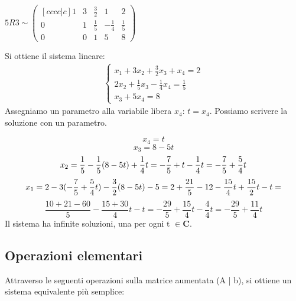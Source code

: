 \documentclass[12pt]{article}
\begin{document}
\begin{center}
$5R3 \sim
\begin{pmatrix}[cccc|c]
  1 & 3 & \frac{3}{2} & 1 & 2\\
  0 & 1 & \frac{1}{5} & -\frac{1}{4} & \frac{1}{5} \\
  0 & 0 & 1 & 5 & 8
\end{pmatrix}$
\end{center}
Si ottiene il sistema lineare:
\begin{align*}
  \begin{cases}
    x_1 + 3x_2 + \frac{3}{2}x_3 + x_4 = 2\\
    2x_2 + \frac{1}{5}x_3 - \frac{1}{4}x_4 = \frac{1}{5}\\
    x_3 + 5x_4 = 8
  \end{cases}
\end{align*}
Assegniamo un parametro alla variabile libera $x_4$: $t = x_4$. Possiamo scrivere la soluzione con un parametro.

\[x_4 = t\]
\[x_3 = 8 - 5t\]
\[x_2 = \frac{1}{5} - \frac{1}{5}(8-5t) + \frac{1}{4}t\\= -\frac{7}{5} + t - \frac{1}{4}t = -\frac{7}{5} + \frac{5}{4}t\]
\[x_1 = 2 - 3(-\frac{7}{5}+\frac{5}{4}t) - \frac{3}{2}(8-5t) - 5\\=2 + \frac{21}{5} - 12 - \frac{15}{4}t + \frac{15}{2}t - t=\]
\[\frac{10+21-60}{5} - \frac{15+30}{4}t - t = -\frac{29}{5} + \frac{15}{4}t - \frac{4}{4}t = -\frac{29}{5} + \frac{11}{4}t\]
Il sistema ha infinite soluzioni, una per ogni t $\in \mathbf{C}$.

\subsection{Operazioni elementari}

Attraverso le seguenti operazioni sulla matrice aumentata (A | b), si ottiene un sistema equivalente più semplice:
\end{document}
